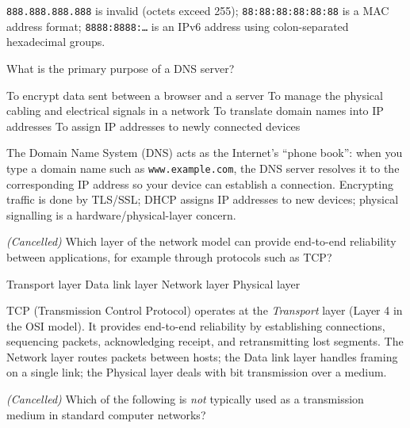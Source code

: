 \documentclass[answers]{exam}
\begin{document}
\begin{questions}
\begin{solution}
    \texttt{888.888.888.888} is invalid (octets exceed 255); \texttt{88:88:88:88:88:88} is a MAC address format; \texttt{8888:8888:\ldots} is an IPv6 address using colon-separated hexadecimal groups.
\end{solution}

\question What is the primary purpose of a DNS server?

\begin{choices}
    \choice To encrypt data sent between a browser and a server
    \choice To manage the physical cabling and electrical signals in a network
    \correctchoice To translate domain names into IP addresses
    \choice To assign IP addresses to newly connected devices
\end{choices}

\begin{solution}
    The Domain Name System (DNS) acts as the Internet's ``phone book'': when you type a domain name such as \texttt{www.example.com}, the DNS server resolves it to the corresponding IP address so your device can establish a connection.
    Encrypting traffic is done by TLS/SSL; DHCP assigns IP addresses to new devices; physical signalling is a hardware/physical-layer concern.
\end{solution}

\question \textit{(Cancelled)} Which layer of the network model can provide end-to-end reliability between applications, for example through protocols such as TCP?

\begin{oneparchoices}
    \correctchoice Transport layer
    \choice Data link layer
    \choice Network layer
    \choice Physical layer
\end{oneparchoices}

\begin{solution}
    TCP (Transmission Control Protocol) operates at the \textit{Transport} layer (Layer 4 in the OSI model).
    It provides end-to-end reliability by establishing connections, sequencing packets, acknowledging receipt, and retransmitting lost segments.
    The Network layer routes packets between hosts; the Data link layer handles framing on a single link; the Physical layer deals with bit transmission over a medium.
\end{solution}

\question \textit{(Cancelled)} Which of the following is \textit{not} typically used as a transmission medium in standard computer networks?


\end{questions}
\end{document}
